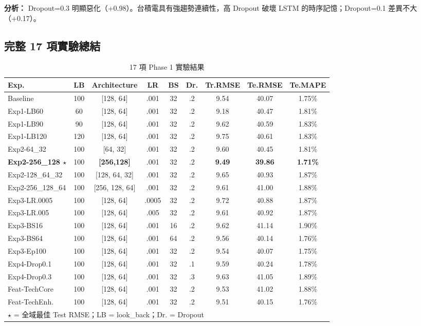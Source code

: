 \documentclass[12pt,a4paper]{article}
\begin{document}
\textbf{分析：} Dropout=0.3 明顯惡化（+0.98）。台積電具有強趨勢連續性，高 Dropout 破壞 LSTM 的時序記憶；Dropout=0.1 差異不大（+0.17）。

\subsection{完整 17 項實驗總結}

\begin{table}[H]
\centering
\caption{17 項 Phase 1 實驗結果}
\small
\begin{tabular}{lcccccccc}
\toprule
\textbf{Exp.} & \textbf{LB} & \textbf{Architecture} & \textbf{LR} & \textbf{BS} & \textbf{Dr.} & \textbf{Tr.RMSE} & \textbf{Te.RMSE} & \textbf{Te.MAPE} \\
\midrule
Baseline       & 100 & [128, 64]     & .001 & 32 & .2 & 9.54 & 40.07 & 1.75\% \\
Exp1-LB60      & 60  & [128, 64]     & .001 & 32 & .2 & 9.18 & 40.47 & 1.81\% \\
Exp1-LB90      & 90  & [128, 64]     & .001 & 32 & .2 & 9.62 & 40.59 & 1.83\% \\
Exp1-LB120     & 120 & [128, 64]     & .001 & 32 & .2 & 9.75 & 40.61 & 1.83\% \\
Exp2-64\_32     & 100 & [64, 32]      & .001 & 32 & .2 & 9.60 & 40.45 & 1.81\% \\
\rowcolor{bestrow}
\textbf{Exp2-256\_128 $\star$} & 100 & \textbf{[256,128]} & .001 & 32 & .2 & \textbf{9.49} & \textbf{39.86} & \textbf{1.71\%} \\
Exp2-128\_64\_32& 100 & [128, 64, 32] & .001 & 32 & .2 & 9.65 & 40.93 & 1.87\% \\
Exp2-256\_128\_64&100 & [256, 128, 64]& .001 & 32 & .2 & 9.61 & 41.00 & 1.88\% \\
Exp3-LR.0005   & 100 & [128, 64]     & .0005& 32 & .2 & 9.72 & 40.88 & 1.87\% \\
Exp3-LR.005    & 100 & [128, 64]     & .005 & 32 & .2 & 9.61 & 40.92 & 1.87\% \\
Exp3-BS16      & 100 & [128, 64]     & .001 & 16 & .2 & 9.62 & 41.14 & 1.90\% \\
Exp3-BS64      & 100 & [128, 64]     & .001 & 64 & .2 & 9.56 & 40.14 & 1.76\% \\
Exp3-Ep100     & 100 & [128, 64]     & .001 & 32 & .2 & 9.54 & 40.07 & 1.75\% \\
Exp4-Drop0.1   & 100 & [128, 64]     & .001 & 32 & .1 & 9.59 & 40.24 & 1.78\% \\
Exp4-Drop0.3   & 100 & [128, 64]     & .001 & 32 & .3 & 9.63 & 41.05 & 1.89\% \\
Feat-TechCore  & 100 & [128, 64]     & .001 & 32 & .2 & 9.53 & 41.02 & 1.88\% \\
Feat-TechEnh.  & 100 & [128, 64]     & .001 & 32 & .2 & 9.51 & 40.15 & 1.76\% \\
\bottomrule
\multicolumn{9}{l}{$\star$ = 全域最佳 Test RMSE；LB = look\_back；Dr. = Dropout} \\
\end{tabular}
\end{table}
\end{document}
